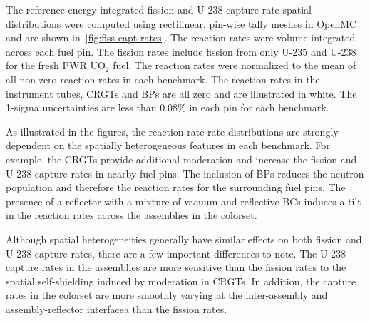The reference energy-integrated fission and U-238 capture rate spatial distributions were computed using rectilinear, pin-wise tally meshes in OpenMC and are shown in~\autoref{fig:fiss-capt-rates}. The reaction rates were volume-integrated across each fuel pin. The fission rates include fission from only U-235 and U-238 for the fresh PWR UO$_2$ fuel. The reaction rates were normalized to the mean of all non-zero reaction rates in each benchmark. The reaction rates in the instrument tubes, CRGTs and BPs are all zero and are illustrated in white. The 1-sigma uncertainties are less than 0.08\% in each pin for each benchmark.

As illustrated in the figures, the reaction rate rate distributions are strongly dependent on the spatially heterogeneous features in each benchmark. For example, the CRGTs provide additional moderation and increase the fission and U-238 capture rates in nearby fuel pins. The inclusion of BPs reduces the neutron population and therefore the reaction rates for the surrounding fuel pins. The presence of a reflector with a mixture of vacuum and reflective BCs induces a tilt in the reaction rates across the assemblies in the colorset.

Although spatial heterogeneities generally have similar effects on both fission and U-238 capture rates, there are a few important differences to note. The U-238 capture rates in the assemblies are more sensitive than the fission rates to the spatial self-shielding induced by moderation in CRGTs. In addition, the capture rates in the colorset are more smoothly varying at the inter-assembly and assembly-reflector interfacea than the fission rates.
